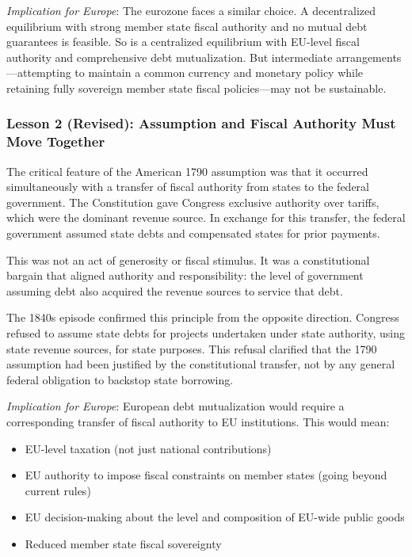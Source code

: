 \documentclass[12pt]{article}
\begin{document}
\textit{Implication for Europe}: The eurozone faces a similar choice. A decentralized equilibrium with strong member state fiscal authority and no mutual debt guarantees is feasible. So is a centralized equilibrium with EU-level fiscal authority and comprehensive debt mutualization. But intermediate arrangements---attempting to maintain a common currency and monetary policy while retaining fully sovereign member state fiscal policies---may not be sustainable.

\subsubsection{Lesson 2 (Revised): Assumption and Fiscal Authority Must Move Together}

The critical feature of the American 1790 assumption was that it occurred simultaneously with a transfer of fiscal authority from states to the federal government. The Constitution gave Congress exclusive authority over tariffs, which were the dominant revenue source. In exchange for this transfer, the federal government assumed state debts and compensated states for prior payments.

This was not an act of generosity or fiscal stimulus. It was a constitutional bargain that aligned authority and responsibility: the level of government assuming debt also acquired the revenue sources to service that debt.

The 1840s episode confirmed this principle from the opposite direction. Congress refused to assume state debts for projects undertaken under state authority, using state revenue sources, for state purposes. This refusal clarified that the 1790 assumption had been justified by the constitutional transfer, not by any general federal obligation to backstop state borrowing.

\textit{Implication for Europe}: European debt mutualization would require a corresponding transfer of fiscal authority to EU institutions. This would mean:
\begin{itemize}
\item EU-level taxation (not just national contributions)
\item EU authority to impose fiscal constraints on member states (going beyond current rules)
\item EU decision-making about the level and composition of EU-wide public goods
\item Reduced member state fiscal sovereignty
\end{itemize}
\end{document}
